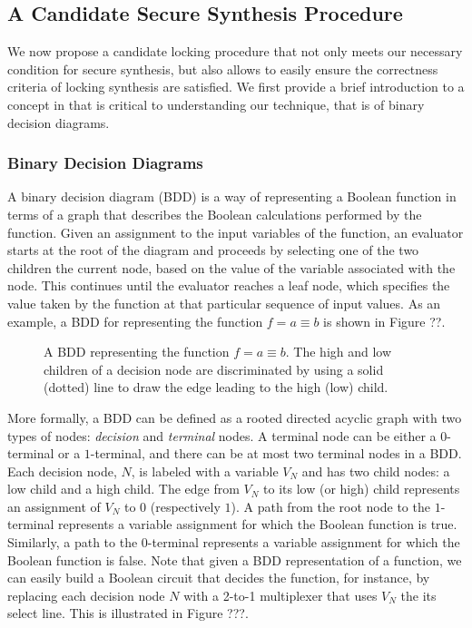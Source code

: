 \subsection{A Candidate Secure Synthesis Procedure}
We now propose a candidate locking procedure that not only meets our necessary condition for secure synthesis, but also allows to easily ensure the correctness criteria of locking synthesis are satisfied. We first provide a brief introduction to a concept in  that is critical to understanding our technique, that is of binary decision diagrams. 

\subsubsection{Binary Decision Diagrams}
A binary decision diagram (BDD) is a way of representing a Boolean function in terms of a graph that describes the Boolean calculations performed by the function. Given an assignment to the input variables of the function, an evaluator starts at the root of the diagram and proceeds by selecting one of the two children the current node, based on the value of the variable associated with the node. This continues until the evaluator reaches a leaf node, which specifies the value taken by the function at that particular sequence of input values. As an example, a BDD for representing the function $f = a \equiv b$ is shown in Figure ??.

\begin{figure}[ht]
  \caption{A BDD representing the function $f = a \equiv b$. The high and low children of a decision node are discriminated by using a solid (dotted) line to draw the edge leading to the high (low) child.}
  \label{fig:dummy2}
\end{figure}

More formally, a BDD can be defined as a rooted directed acyclic graph with two types of nodes: \emph{decision} and \emph{terminal} nodes. A terminal node can be either a $0$-terminal or a $1$-terminal, and there can be at most two terminal nodes in a BDD. Each decision node, $N$, is labeled with a variable $V_N$ and has two child nodes: a low child and a high child. The edge from $V_N$ to its low (or high) child represents an assignment of $V_N$ to $0$ (respectively $1$). A path from the root node to the $1$-terminal represents a variable assignment for which the Boolean function is true. Similarly, a path to the $0$-terminal represents a variable assignment for which the Boolean function is false. Note that given a BDD representation of a function, we can easily build a Boolean circuit that decides the function, for instance, by replacing each decision node $N$ with a 2-to-1 multiplexer that uses $V_N$ the its select line. This is illustrated in Figure ???.

